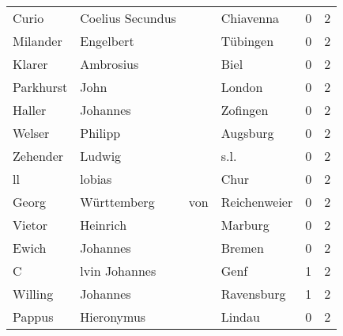 \documentclass[10pt,a4paper,landscape]{article}
\begin{document}
\begin{longtable}{llllrr}
                    Curio &                   Coelius Secundus &             &                                   Chiavenna &          0 &         2 \\
                 Milander &                          Engelbert &             &                                    Tübingen &          0 &         2 \\
                   Klarer &                          Ambrosius &             &                                        Biel &          0 &         2 \\
                Parkhurst &                               John &             &                                      London &          0 &         2 \\
                   Haller &                           Johannes &             &                                    Zofingen &          0 &         2 \\
                   Welser &                            Philipp &             &                                    Augsburg &          0 &         2 \\
                 Zehender &                             Ludwig &             &                                        s.l. &          0 &         2 \\
                       ll &                             lobias &             &                                        Chur &          0 &         2 \\
                    Georg &                        Württemberg &         von &                                Reichenweier &          0 &         2 \\
                   Vietor &                           Heinrich &             &                                     Marburg &          0 &         2 \\
                    Ewich &                           Johannes &             &                                      Bremen &          0 &         2 \\
                        C &                      lvin Johannes &             &                                        Genf &          1 &         2 \\
                  Willing &                           Johannes &             &                                  Ravensburg &          1 &         2 \\
                   Pappus &                         Hieronymus &             &                                      Lindau &          0 &         2 \\

\end{longtable}
\end{document}
